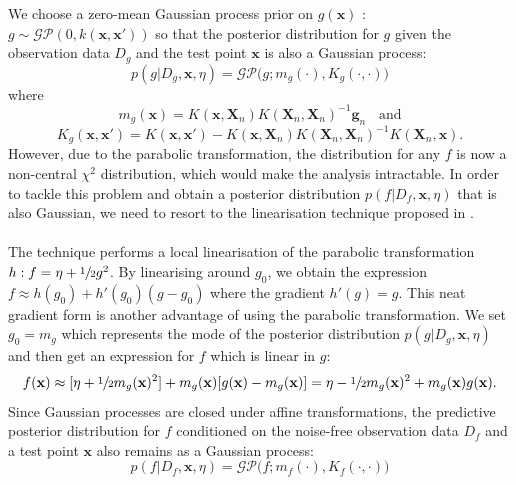 \documentclass[a4paper,11pt]{report}
\begin{document}
We choose a zero-mean Gaussian process prior on $g(\mathbf{x})$ : $ g \sim \mathcal{GP} (0, k(\mathbf{x},\mathbf{x}'))$ so that the posterior distribution for $ g $ given the observation data $D_g$ and the test point $\mathbf{x} $ is also a Gaussian process:
\begin{equation}
p(g \vert D_g,\mathbf{x} ,\eta) = \mathcal{GP} \big(g; m_{g} (\cdot), K_{g} (\cdot,\cdot) \big) 
\end{equation}
where 
	\begin{equation} 
	m_g (\mathbf{x}) = K(\mathbf{x}, \mathbf{X}_n)  K(\mathbf{X}_n,\mathbf{X}_n)^{-1} \mathbf{g}_n  \hspace{11pt}   \text{and} 
	\end{equation}
	\begin{equation} 
	K_g (\mathbf{x},\mathbf{x}')=K(\mathbf{x},\mathbf{x}') - K( \mathbf{x}, \mathbf{X}_n) K(\mathbf{X}_n,\mathbf{X}_n)^{-1} K(\mathbf{X}_n,\mathbf{x}).
        \end{equation}
\noindent
However, due to the parabolic transformation, the distribution for any $f $ is now a non-central $\chi^2$ distribution, which would make the analysis intractable. In order to tackle this problem and obtain a posterior distribution $ p(f \vert D_f, \mathbf{x},\eta)$ that is also Gaussian, we need to resort to the linearisation technique proposed in \cite{gunter2014sampling}.
\\\\ \noindent
The technique performs a local linearisation of the parabolic transformation $ h : f =\eta+\sfrac{1}{2}g^2$. By linearising around $g_0$, we obtain the expression $f \approx h(g_0)+h'(g_0)(g - g_0)$ where the gradient $h'(g)=g$. This neat gradient form is another advantage of using the parabolic transformation. We set $ g_0 = m_g $ which represents the mode of the posterior distribution  $p(g \vert D_g,\mathbf{x}, \eta )$ and then get an expression for $f$ which is linear in $g$:
      \begin{equation} 
	f(\mathbf{x}) \approx [\eta+\sfrac{1}{2}m_g(\mathbf{x})^2 ] + m_g(\mathbf{x}) [ g(\mathbf{x}) - m_g(\mathbf{x}) ] = \eta - \sfrac{1}{2}m_g(\mathbf{x})^2 + m_g(\mathbf{x}) g(\mathbf{x}).
        \end{equation}
\noindent
Since Gaussian processes are closed under affine transformations, the predictive posterior distribution for $f$ conditioned on the noise-free observation data $D_f$ and a test point $\mathbf{x}$ also remains as a Gaussian process: 
	\begin{equation}
	p(f \vert D_f,\mathbf{x},\eta) = \mathcal{GP} \big(f; m_{f} (\cdot), K_{f} (\cdot,\cdot) \big)   
	\end{equation}   
\end{document}
